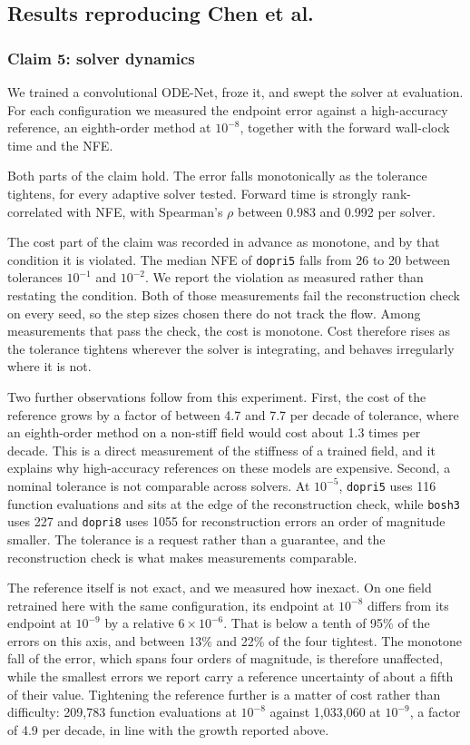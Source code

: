 \subsection{Results reproducing Chen et al.}

\subsubsection{Claim 5: solver dynamics}
\label{sec:claim5}

We trained a convolutional ODE-Net, froze it, and swept the solver at evaluation. For each
configuration we measured the endpoint error against a high-accuracy reference, an
eighth-order method at $10^{-8}$, together with the forward wall-clock time and the NFE.

Both parts of the claim hold. The error falls monotonically as the tolerance tightens, for
every adaptive solver tested. Forward time is strongly rank-correlated with NFE, with
Spearman's $\rho$ between 0.983 and 0.992 per solver.

The cost part of the claim was recorded in advance as monotone, and by that condition it is
violated. The median NFE of \texttt{dopri5} falls from 26 to 20 between tolerances $10^{-1}$
and $10^{-2}$. We report the violation as measured rather than restating the condition. Both
of those measurements fail the reconstruction check on every seed, so the step sizes chosen
there do not track the flow. Among measurements that pass the check, the cost is monotone.
Cost therefore rises as the tolerance tightens wherever the solver is integrating, and behaves
irregularly where it is not.

Two further observations follow from this experiment. First, the cost of the reference grows by a factor of between 4.7 and 7.7 per decade of tolerance, where an eighth-order method on a non-stiff
field would cost about 1.3 times per decade. This is a direct measurement of the stiffness of
a trained field, and it explains why high-accuracy references on these models are expensive.
Second, a nominal tolerance is not comparable across solvers. At $10^{-5}$, \texttt{dopri5}
uses 116 function evaluations and sits at the edge of the reconstruction check, while
\texttt{bosh3} uses 227 and \texttt{dopri8} uses 1055 for reconstruction errors an order of
magnitude smaller. The tolerance is a request rather than a guarantee, and the reconstruction
check is what makes measurements comparable.

The reference itself is not exact, and we measured how inexact. On one field retrained here
with the same configuration, its endpoint
at $10^{-8}$ differs from its endpoint at $10^{-9}$ by a relative $6\times10^{-6}$. That is
below a tenth of 95\% of the errors on this axis, and between 13\% and 22\% of the four
tightest. The monotone fall of the error, which spans four orders of magnitude, is therefore
unaffected, while the smallest errors we report carry a reference uncertainty of about a fifth
of their value. Tightening the reference further is a matter of cost rather than difficulty:
209{,}783 function evaluations at $10^{-8}$ against 1{,}033{,}060 at $10^{-9}$, a factor of 4.9
per decade, in line with the growth reported above.

